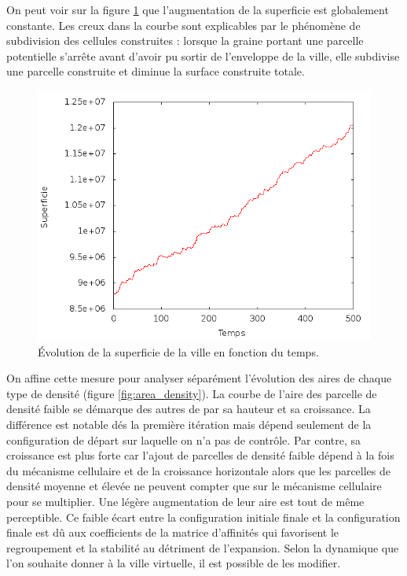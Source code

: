 \documentclass[10pt]{article}
\begin{document}
On peut voir sur la figure \ref{fig:area} que l'augmentation de la
superficie est globalement constante. Les creux dans la courbe sont
explicables par le phénomène de subdivision des cellules construites :
lorsque la graine portant une parcelle potentielle s'arrête avant
d'avoir pu sortir de l'enveloppe de la ville, elle subdivise une
parcelle construite et diminue la surface construite totale.

\begin{figure}[H]
  \centering
  \includegraphics[width=.8\linewidth]{images/area.png}
  \caption{Évolution de la superficie de la ville en fonction du temps.}
  \label{fig:area}
\end{figure}

On affine cette mesure pour analyser séparément l'évolution des aires
de chaque type de densité (figure \ref{fig:area_density}). La courbe
de l'aire des parcelle de densité faible se démarque des autres de par
sa hauteur et sa croissance. La différence est notable dés la première
itération mais dépend seulement de la configuration de départ sur
laquelle on n'a pas de contrôle. Par contre, sa croissance est plus
forte car l'ajout de parcelles de densité faible dépend à la fois du
mécanisme cellulaire et de la croissance horizontale alors que les
parcelles de densité moyenne et élevée ne peuvent compter que sur le
mécanisme cellulaire pour se multiplier. Une légère augmentation de
leur aire est tout de même perceptible. Ce faible écart entre la
configuration initiale finale et la configuration finale est dû aux
coefficients de la matrice d'affinités qui favorisent le regroupement
et la stabilité au détriment de l'expansion. Selon la dynamique que
l'on souhaite donner à la ville virtuelle, il est possible de les
modifier.
\end{document}
